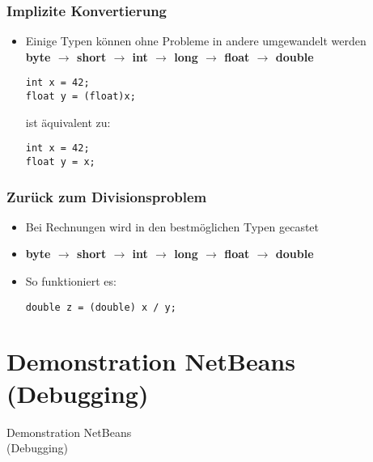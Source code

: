 \documentclass[final]{beamer}
\newcommand{\keyWord}[1]{\textbf{#1}}
\newcommand{\ra}{\ensuremath{\rightarrow}\xspace}
\begin{document}
\begin{frame}[fragile]
  \frametitle{Implizite Konvertierung}
  \begin{itemize}
    \item[] Einige Typen können ohne Probleme in andere umgewandelt werden\\
\keyWord{byte \ra short \ra int \ra long \ra float \ra double}
    \begin{lstlisting}
int x = 42;
float y = (float)x;
    \end{lstlisting}
    ist äquivalent zu:
    \begin{lstlisting}
int x = 42;
float y = x;
    \end{lstlisting}
  \end{itemize}
\end{frame}

\begin{frame}[fragile]
  \frametitle{Zurück zum Divisionsproblem}
  \begin{itemize}
    \begin{lstlisting}
int x = 7;

int y = 2;

double z = x / y;
    \end{lstlisting}
    \item Bei Rechnungen wird in den bestmöglichen Typen gecastet
    
    \item[]\keyWord{byte \ra short \ra int \ra long \ra float \ra double}
    \item So funktioniert es:
    \begin{lstlisting}
double z = (double) x / y;
    \end{lstlisting}    
  \end{itemize}
\end{frame}

\section{Demonstration NetBeans (Debugging)}
\begin{frame}[fragile]
  \begin{center}
    \Huge{Demonstration NetBeans \\ (Debugging)}
  \end{center}
\end{frame}
\end{document}
